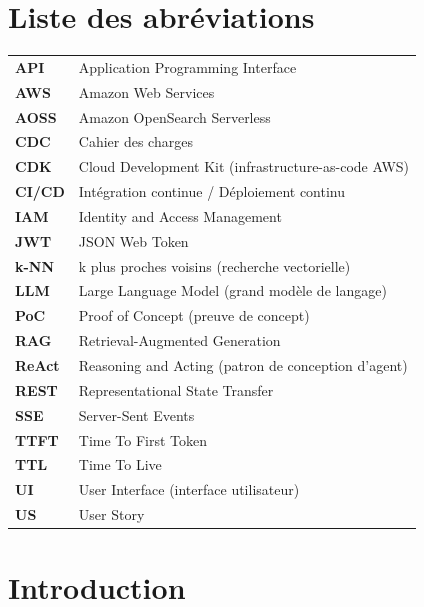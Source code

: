 \documentclass[11pt,a4paper]{report}
\begin{document}
\listoftables
{}

\chapter*{Liste des abréviations}
\begin{tabularx}{\linewidth}{@{}l Y@{}}
\textbf{API} & Application Programming Interface \\
\textbf{AWS} & Amazon Web Services \\
\textbf{AOSS} & Amazon OpenSearch Serverless \\
\textbf{CDC} & Cahier des charges \\
\textbf{CDK} & Cloud Development Kit (infrastructure-as-code AWS) \\
\textbf{CI/CD} & Intégration continue / Déploiement continu \\
\textbf{IAM} & Identity and Access Management \\
\textbf{JWT} & JSON Web Token \\
\textbf{k-NN} & k plus proches voisins (recherche vectorielle) \\
\textbf{LLM} & Large Language Model (grand modèle de langage) \\
\textbf{PoC} & Proof of Concept (preuve de concept) \\
\textbf{RAG} & Retrieval-Augmented Generation \\
\textbf{ReAct} & Reasoning and Acting (patron de conception d'agent) \\
\textbf{REST} & Representational State Transfer \\
\textbf{SSE} & Server-Sent Events \\
\textbf{TTFT} & Time To First Token \\
\textbf{TTL} & Time To Live \\
\textbf{UI} & User Interface (interface utilisateur) \\
\textbf{US} & User Story \\
\end{tabularx}

\setcounter{page}{1}

\chapter{Introduction}
\end{document}
